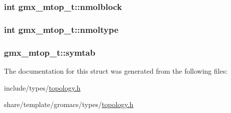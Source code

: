 \hypertarget{structgmx__mtop__t_afc42713ad6603011999e9850a5e7ce57}{
\subsubsection[{nmolblock}]{\setlength{\rightskip}{0pt plus 5cm}int {\bf gmx\-\_\-mtop\-\_\-t\-::nmolblock}}}\label{structgmx__mtop__t_afc42713ad6603011999e9850a5e7ce57}
\hypertarget{structgmx__mtop__t_a37880d571aca73e3f3c180f6136c0cad}{
\subsubsection[{nmoltype}]{\setlength{\rightskip}{0pt plus 5cm}int {\bf gmx\-\_\-mtop\-\_\-t\-::nmoltype}}}\label{structgmx__mtop__t_a37880d571aca73e3f3c180f6136c0cad}
\hypertarget{structgmx__mtop__t_a3e93edbb63dc53331d86c5244eb79f07}{
\subsubsection[{symtab}]{ {\bf gmx\-\_\-mtop\-\_\-t\-::symtab}}}\label{structgmx__mtop__t_a3e93edbb63dc53331d86c5244eb79f07}


\-The documentation for this struct was generated from the following files\-:\begin{DoxyCompactItemize}
\item 
include/types/\hyperlink{include_2types_2topology_8h}{topology.\-h}\item 
share/template/gromacs/types/\hyperlink{share_2template_2gromacs_2types_2topology_8h}{topology.\-h}\end{DoxyCompactItemize}
